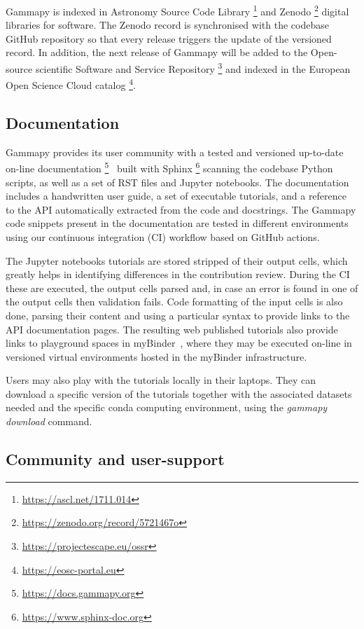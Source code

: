 Gammapy is indexed in Astronomy Source Code Library \footnote{\url{https://ascl.net/1711.014}} and Zenodo \footnote{\url{https://zenodo.org/record/5721467o}} digital libraries for software. The Zenodo record is synchronised with the codebase GitHub repository so that every release triggers the update of the versioned record. In addition, the next release of Gammapy will be added to the Open-source scientific Software and Service Repository \footnote{\url{https://projectescape.eu/ossr}} and indexed in the European Open Science Cloud catalog \footnote{\url{https://eosc-portal.eu}}.

\subsection{Documentation}
\label{ssec:documentation}
Gammapy provides its user community with a tested and versioned up-to-date on-line documentation \footnote{\url{https://docs.gammapy.org}}~\citep{2019ASPC..523..357B} built with Sphinx \footnote{\url{https://www.sphinx-doc.org}} scanning the codebase Python scripts, as well as a set of RST files and Jupyter notebooks. The documentation includes a handwritten user guide, a set of executable tutorials, and a reference to the API automatically extracted from the code and docstrings. The Gammapy code snippets present in the documentation are tested in different environments using our continuous integration (CI) workflow based on GitHub actions.

The Jupyter notebooks tutorials are stored stripped of their output cells, which greatly helps in identifying differences in the contribution review. During the CI these are executed, the output cells parsed and, in case an error is found in one of the output cells then validation fails. Code formatting of the input cells is also done, parsing their content and using a particular syntax to provide links to the API documentation pages. The resulting web published tutorials also provide links to playground spaces in myBinder~\citep{project_jupyter-proc-scipy-2018}, where they may be executed on-line in versioned virtual environments hosted in the myBinder infrastructure.

Users may also play with the tutorials locally in their laptops. They can download a specific version of the tutorials together with the associated datasets needed and the specific conda computing environment, using the \textit{gammapy download} command.

\subsection{Community and user-support}
\label{ssec:community-and-user-support}

